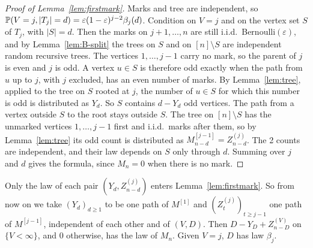 \begin{proof}[Proof of Lemma~\ref{lem:firstmark}]
Marks and tree are independent, so
$\mathbb{P}(V=j,\lvert T_j\rvert=d)=\varepsilon(1-\varepsilon)^{j-2}\beta_j(d)$.
Condition on $V=j$ and on the vertex set $S$ of $T_j$, with $\lvert S\rvert=d$.
Then the marks on $j+1,\dots,n$ are still i.i.d.\ Bernoulli$(\varepsilon)$,
and by Lemma~\ref{lem:B-split} the trees on $S$ and on $[n]\setminus S$ are
independent random recursive trees. The vertices $1,\dots,j-1$ carry no
mark, so the parent of $j$ is even and $j$ is odd. A vertex $u\in S$ is
therefore odd exactly when the path from $u$ up to $j$, with $j$ excluded,
has an even number of marks. By Lemma~\ref{lem:tree}, applied to the tree
on $S$ rooted at $j$, the number of $u\in S$ for which this number is odd
is distributed as $Y_d$. So $S$ contains $d-Y_d$ odd vertices. The path
from a vertex outside $S$ to the root stays outside $S$. The tree on
$[n]\setminus S$ has the unmarked vertices $1,\dots,j-1$ first and i.i.d.\
marks after them, so by Lemma~\ref{lem:tree} its odd count is distributed as
$M^{[j-1]}_{n-d}=Z^{(j)}_{n-d}$. The 2 counts are independent, and their law
depends on $S$ only through $d$. Summing over $j$ and $d$ gives the formula,
since $M_n=0$ when there is no mark.
\end{proof}

Only the law of each pair $(Y_d,Z^{(j)}_{n-d})$ enters
Lemma~\ref{lem:firstmark}. So from now on we take $(Y_d)_{d\ge1}$ to be one
path of $M^{[1]}$ and $(Z^{(j)}_t)_{t\ge j-1}$ one path of $M^{[j-1]}$,
independent of each other and of $(V,D)$. Then $D-Y_D+Z^{(V)}_{n-D}$ on
$\{V<\infty\}$, and $0$ otherwise, has the law of $M_n$. Given $V=j$, $D$
has law $\beta_j$.

